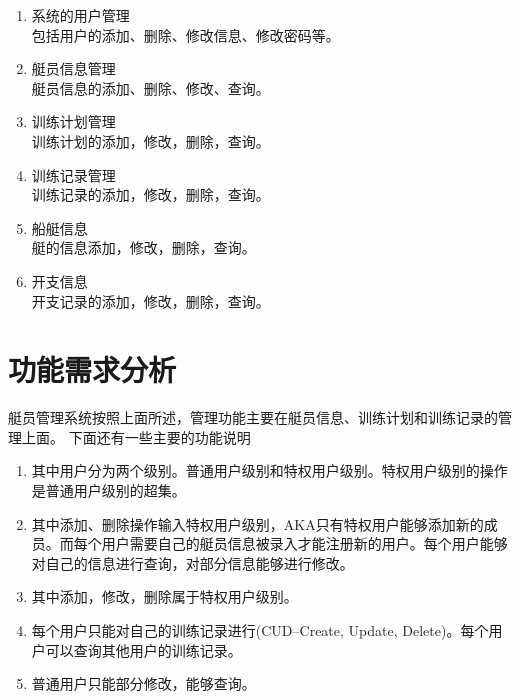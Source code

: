\begin{enumerate}
\item
  {系统的用户管理\\
    包括用户的添加、删除、修改信息、修改密码等。}

\item{艇员信息管理\\
    艇员信息的添加、删除、修改、查询。
  }

\item{训练计划管理\\
    训练计划的添加，修改，删除，查询。
  }

\item {训练记录管理\\
    训练记录的添加，修改，删除，查询。
  }

\item {船艇信息\\
    艇的信息添加，修改，删除，查询。
  }

\item {开支信息\\
    开支记录的添加，修改，删除，查询。
  }

\end{enumerate}






\section{功能需求分析}
艇员管理系统按照上面所述，管理功能主要在艇员信息、训练计划和训练记录的管理上面。
下面还有一些主要的功能说明
\begin{enumerate}
\item{其中用户分为两个级别。普通用户级别和特权用户级别。特权用户级别的操作是普通用户级别的超集。}

\item{其中添加、删除操作输入特权用户级别，AKA只有特权用户能够添加新的成员。而每个用户需要自己的艇员信息被录入才能注册新的用户。每个用户能够对自己的信息进行查询，对部分信息能够进行修改。}

\item{其中添加，修改，删除属于特权用户级别。}

\item{每个用户只能对自己的训练记录进行(CUD--Create, Update, Delete)。每个用户可以查询其他用户的训练记录。}

\item{普通用户只能部分修改，能够查询。}
\end{enumerate}

